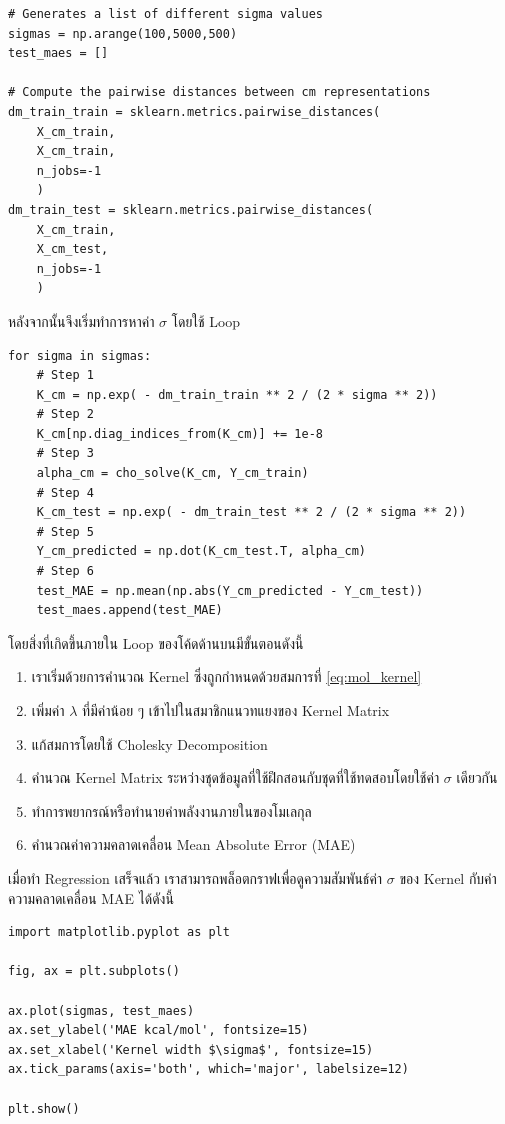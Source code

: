 \begin{lstlisting}[style=MyPython]
# Generates a list of different sigma values
sigmas = np.arange(100,5000,500) 
test_maes = []

# Compute the pairwise distances between cm representations
dm_train_train = sklearn.metrics.pairwise_distances(
    X_cm_train, 
    X_cm_train, 
    n_jobs=-1
    )
dm_train_test = sklearn.metrics.pairwise_distances(
    X_cm_train, 
    X_cm_test, 
    n_jobs=-1
    )
\end{lstlisting}

\vspace{1em}

\noindent หลังจากนั้นจึงเริ่มทำการหาค่า $\sigma$ โดยใช้ Loop

\begin{lstlisting}[style=MyPython]
for sigma in sigmas:
    # Step 1
    K_cm = np.exp( - dm_train_train ** 2 / (2 * sigma ** 2)) 
    # Step 2
    K_cm[np.diag_indices_from(K_cm)] += 1e-8
    # Step 3
    alpha_cm = cho_solve(K_cm, Y_cm_train)
    # Step 4
    K_cm_test = np.exp( - dm_train_test ** 2 / (2 * sigma ** 2))
    # Step 5
    Y_cm_predicted = np.dot(K_cm_test.T, alpha_cm)
    # Step 6
    test_MAE = np.mean(np.abs(Y_cm_predicted - Y_cm_test))
    test_maes.append(test_MAE)
\end{lstlisting}
%
\vspace{1em}
%
โดยสิ่งที่เกิดขึ้นภายใน Loop ของโค้ดด้านบนมีขั้นตอนดังนี้
%
\begin{enumerate}[topsep=0pt,noitemsep]\setlength\itemsep{0.5em}
    \item เราเริ่มด้วยการคำนวณ Kernel ซึ่งถูกกำหนดด้วยสมการที่ \eqref{eq:mol_kernel}

    \item เพิ่มค่า $\lambda$ ที่มีค่าน้อย ๆ เข้าไปในสมาชิกแนวทแยงของ Kernel Matrix

    \item แก้สมการโดยใช้ Cholesky Decomposition

    \item คำนวณ Kernel Matrix ระหว่างชุดข้อมูลที่ใช้ฝึกสอนกับชุดที่ใช้ทดสอบโดยใช้ค่า $\sigma$ เดียวกัน

    \item ทำการพยากรณ์หรือทำนายค่าพลังงานภายในของโมเลกุล

    \item คำนวณค่าความคลาดเคลื่อน Mean Absolute Error (MAE)
\end{enumerate}

เมื่อทำ Regression เสร็จแล้ว เราสามารถพล็อตกราฟเพื่อดูความสัมพันธ์ค่า $\sigma$ ของ Kernel กับค่าความคลาดเคลื่อน MAE ได้ดังนี้
%
\begin{lstlisting}[style=MyPython]
import matplotlib.pyplot as plt

fig, ax = plt.subplots()

ax.plot(sigmas, test_maes)
ax.set_ylabel('MAE kcal/mol', fontsize=15)
ax.set_xlabel('Kernel width $\sigma$', fontsize=15)
ax.tick_params(axis='both', which='major', labelsize=12)

plt.show()
\end{lstlisting}

